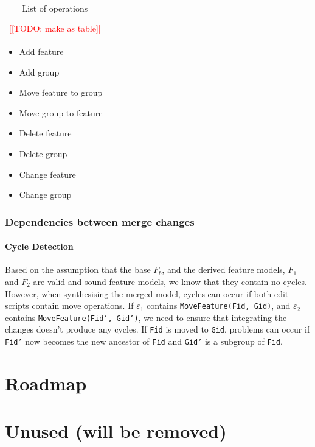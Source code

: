 \documentclass[a4paper,english]{ifimaster}
\newcommand{\todo}[1]{\textcolor{red}{[[TODO: #1]]}\PackageWarning{TODO:}{#1!}}
\newcommand{\Fb}{$F_b$}
\newcommand{\FOne}{$F_1$}
\newcommand{\FTwo}{$F_2$}
\newcommand{\EsOne}{$\varepsilon_1$}
\newcommand{\EsTwo}{$\varepsilon_2$}
\begin{document}
\begin{table}[htpb]
	\centering
	\caption{List of operations}
	\label{tab:list_of_operations}
	\begin{tabular}{c}
		\todo{make as table}
	\end{tabular}
	\begin{itemize}
		\item Add feature
		\item Add group
		\item Move feature to group
		\item Move group to feature
		\item Delete feature
		\item Delete group
		\item Change feature
		\item Change group
	\end{itemize}
\end{table}

\subsection{Dependencies between merge changes}%
\label{sub:dependencies_between_merge_changes}

\subsubsection{Cycle Detection}%
\label{ssub:cycle_detection}

Based on the assumption that the base \Fb{}, and the derived feature models, \FOne{} and \FTwo{} are valid and sound feature models, we know that they contain no cycles. However, when synthesising the merged model, cycles can occur if both edit scripts contain move operations. If \EsOne{} contains \texttt{MoveFeature(Fid, Gid)}, and \EsTwo{} contains \texttt{MoveFeature(Fid', Gid')}, we need to ensure that integrating the changes doesn't produce any cycles. If \texttt{Fid} is moved to \texttt{Gid}, problems can occur if \texttt{Fid'} now becomes the new ancestor of \texttt{Fid} and \texttt{Gid'} is a subgroup of \texttt{Fid}.

\chapter{Roadmap}%
\label{cha:roadmap}

\chapter{Unused (will be removed)}%
\label{cha:unused_will_be_removed_}
\end{document}
